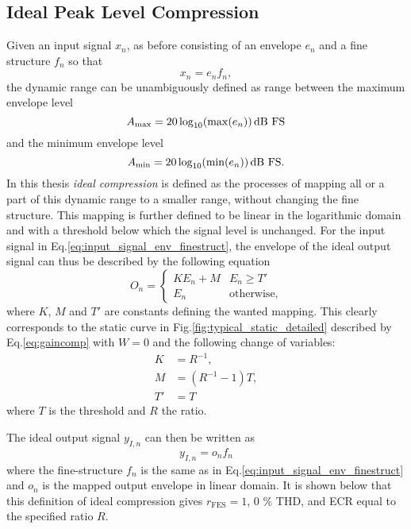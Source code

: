 \documentclass[../main2.tex]{subfiles}
\begin{document}
\FloatBarrier
\subsection{Ideal Peak Level Compression}\label{method_ideal_peak_compression}
Given an input signal $x_n$, as before consisting of an envelope $e_n$ and a fine structure $f_n$ so that
\begin{equation}\label{eq:input_signal_env_finestruct}
x_n = e_n f_n,
\end{equation}
the dynamic range can be unambiguously defined as range between the maximum envelope level
\begin{equation}
A_\text{max} = 20 \log_{10} (\max(e_n)) \mskip3mu\text{dB FS}
\end{equation}
and the minimum envelope level
\begin{equation}
A_\text{min} = 20 \log_{10} (\min(e_n)) \mskip3mu\text{dB FS}.
\end{equation}
In this thesis \emph{ideal compression} is defined as the processes of mapping all or a part of this dynamic range to a smaller range, without changing the fine structure. This mapping is further defined to be linear in the logarithmic domain and with a threshold below which the signal level is unchanged. For the input signal in Eq.\eqref{eq:input_signal_env_finestruct}, the envelope of the ideal output signal can thus be described by the following equation
\begin{equation}\label{eq:dynamic_range_mapping}
O_n =
\begin{cases}
	K E_n + M 					& E_n \geq T'  \\
	E_n							& \text{otherwise},
\end{cases}
\end{equation}
where $K$, $M$ and $T'$ are constants defining the wanted mapping. This clearly corresponds to the static curve in Fig.\ref{fig:typical_static_detailed} described by Eq.\eqref{eq:gaincomp} with $W=0$ and the following change of variables:
\begin{equation}
\begin{split}
K &= R^{-1}, \\
M &= (R^{-1}-1)T,\\
T' &= T
\end{split}
\end{equation}
where $T$ is the threshold and $R$ the ratio.

The ideal output signal $y_{I,n}$ can then be written as
\begin{equation}\label{eq:ideal_output}
y_{I,n} = o_n f_n
\end{equation}
where the fine-structure $f_n$ is the same as in Eq.\eqref{eq:input_signal_env_finestruct} and $o_n$ is the mapped output envelope in linear domain. It is shown below that this definition of ideal compression gives $r_\text{FES} = 1$, 0 \% THD, and ECR equal to the specified ratio $R$.
\end{document}
